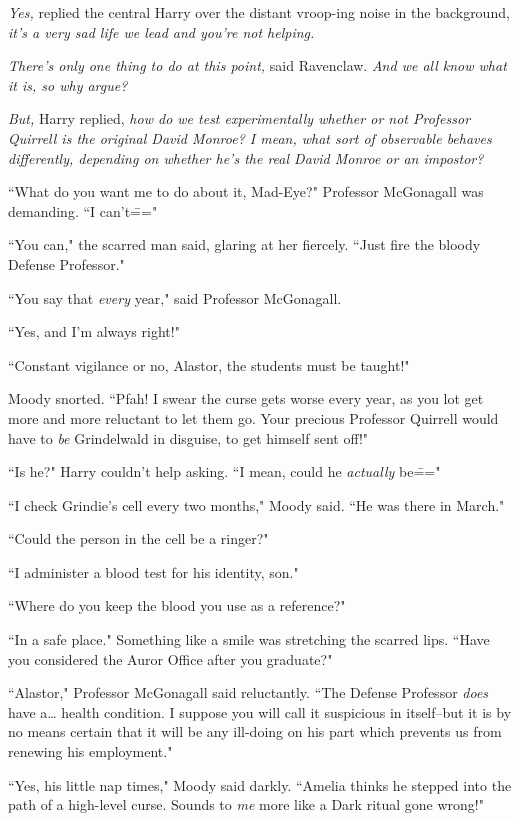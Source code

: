 \emph{Yes,} replied the central Harry over the distant vroop-ing noise in the background, \emph{it's a very sad life we lead and \emph{you're not helping}.}

\emph{There's only one thing to do at this point,} said Ravenclaw. \emph{And we all know what it is, so why argue?}

\emph{But,} Harry replied, \emph{how \emph{do} we test experimentally whether or not Professor Quirrell is the original David Monroe? I mean, what sort of observable behaves differently, depending on whether he's the real David Monroe or an impostor?}

``What do you want me to do about it, Mad-Eye?" Professor McGonagall was demanding. ``I can't\==="

``You can," the scarred man said, glaring at her fiercely. ``Just fire the bloody Defense Professor."

``You say that \emph{every} year," said Professor McGonagall.

``Yes, and I'm always right!"

``Constant vigilance or no, Alastor, the students must be taught!"

Moody snorted. ``Pfah! I swear the curse gets worse every year, as you lot get more and more reluctant to let them go. Your precious Professor Quirrell would have to \emph{be} Grindelwald in disguise, to get himself sent off!"

``Is he?" Harry couldn't help asking. ``I mean, could he \emph{actually} be\==="

``I check Grindie's cell every two months," Moody said. ``He was there in March."

``Could the person in the cell be a ringer?"

``I administer a blood test for his identity, son."

``Where do you keep the blood you use as a reference?"

``In a safe place." Something like a smile was stretching the scarred lips. ``Have you considered the Auror Office after you graduate?"

``Alastor," Professor McGonagall said reluctantly. ``The Defense Professor \emph{does} have a{\ldots} health condition. I suppose you will call it suspicious in itself\---but it is by no means certain that it will be any ill-doing on his part which prevents us from renewing his employment."

``Yes, his little nap times," Moody said darkly. ``Amelia thinks he stepped into the path of a high-level curse. Sounds to \emph{me} more like a Dark ritual gone wrong!"

